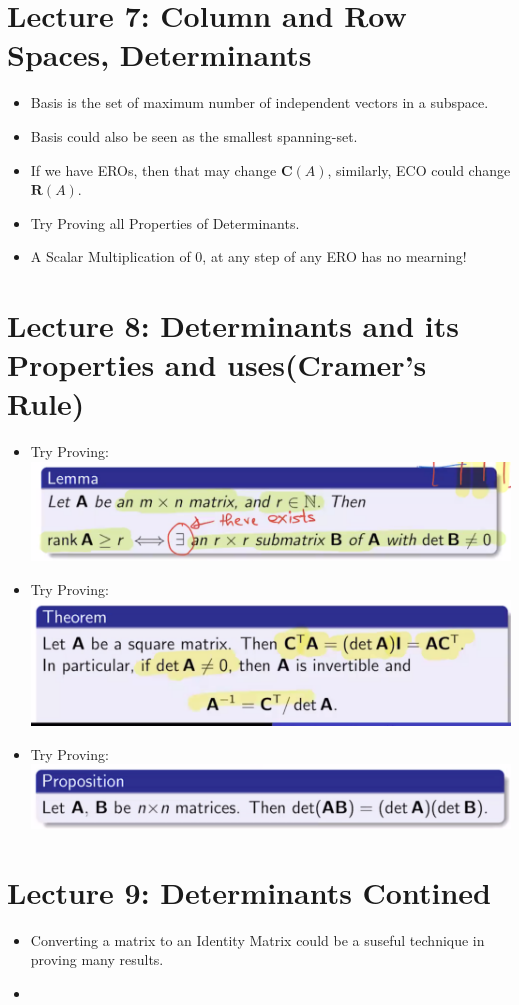\documentclass{article}
\begin{document}
\section{Lecture 7: Column and Row Spaces, Determinants}

  \begin{itemize}
    \item Basis is the set of maximum number of independent vectors in a subspace.
    \item Basis could also be seen as the smallest spanning-set.
    \item If we have EROs, then that may change $\mathbf{C}(A)$, similarly, ECO could change $\mathbf{R}(A)$.
    \item Try Proving all Properties of Determinants.
    \item A Scalar Multiplication of 0, at any step of any ERO has no mearning!
  \end{itemize}

\section{Lecture 8: Determinants and its Properties and uses(Cramer's Rule)}

\begin{itemize}
  \item Try Proving: \\
  \includegraphics[scale = 0.4]{5.png}
  \item Try Proving: \\
  \includegraphics[scale = 0.3]{6.png}
  \item Try Proving: \\
  \includegraphics[scale = 0.4]{7.png}
\end{itemize}
\section{Lecture 9: Determinants Contined}
\begin{itemize}
  \item Converting a matrix to an Identity Matrix could be a suseful technique in proving many results.
  \item
\end{itemize}
\end{document}
